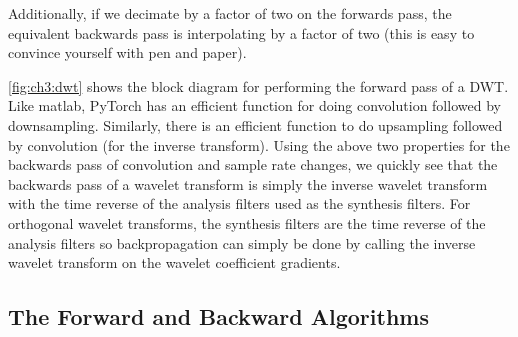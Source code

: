 Additionally, if we decimate by a factor of two on the forwards pass, the
equivalent backwards pass is interpolating by a factor of two (this is easy to
convince yourself with pen and paper).

\autoref{fig:ch3:dwt} shows the block diagram for performing the forward pass of
a DWT. Like matlab, PyTorch has an efficient function for doing convolution
followed by downsampling. Similarly, there is an efficient function to do
upsampling followed by convolution (for the inverse transform). Using the above
two properties for the backwards pass of convolution and sample rate
changes, we quickly see that the backwards pass of a wavelet transform is simply
the inverse wavelet transform with the time reverse of the analysis filters used
as the synthesis filters. For orthogonal wavelet transforms, the synthesis
filters are the time reverse of the analysis filters so backpropagation can
simply be done by calling the inverse wavelet transform on the wavelet
coefficient gradients.

\subsection{The Forward and Backward Algorithms}
